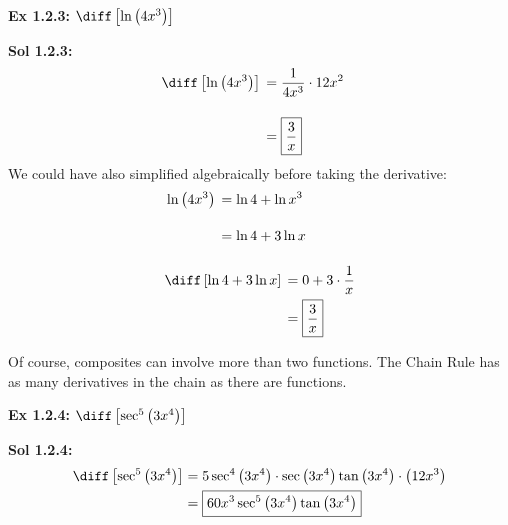 \begin{tcolorbox}[example]
    \textbf{Ex 1.2.3: } $\diff \left[\ln \left(4x^3\right)\right]$ 
\end{tcolorbox}
\begin{tcolorbox}[solution]
    \textbf{Sol 1.2.3: } \begin{align*}
        & \diff \left[\ln \left(4x^3\right)\right] \begin{aligned}[t]
            & = \dfrac{1}{4x^3} \cdot 12x^2 \\[11pt]
            & = \boxed{\dfrac{3}{x}} 
        \end{aligned}
    \end{align*} 
    We could have also simplified algebraically before taking the derivative: \begin{align*}
        & \ln \left(4x^3\right) \begin{aligned}[t]
            & = \ln 4 + \ln x^3 \\[11pt]
            & = \ln 4 + 3\ln x 
        \end{aligned} \\[11pt]
        & \diff \left[\ln 4 + 3\ln x\right] \begin{aligned}[t]
            & = 0 + 3 \cdot \dfrac{1}{x} \\
            & = \boxed{\dfrac{3}{x}}
        \end{aligned}
    \end{align*}
\end{tcolorbox}

Of course, composites can involve more than two functions. The Chain Rule has as many derivatives in the chain as there are functions. \par

\begin{tcolorbox}[example]
    \textbf{Ex 1.2.4: } $\diff \left[\sec^5 \left(3x^4\right)\right]$ 
\end{tcolorbox}
\begin{tcolorbox}[solution]
    \textbf{Sol 1.2.4: } \begin{align*}
        \diff \left[\sec^5 \left(3x^4\right)\right] & = 5\sec^4 \left(3x^4\right) \cdot \sec \left(3x^4\right) \tan \left(3x^4\right) \cdot \left(12x^3\right) \\
        & = \boxed{60x^3\sec^5 \left(3x^4\right)\tan \left(3x^4\right)}
    \end{align*}
\end{tcolorbox} \vspace{11pt}

